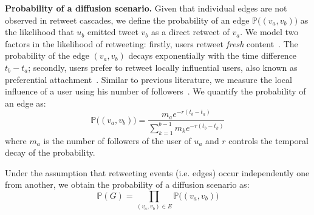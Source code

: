 \textbf{Probability of a diffusion scenario.}
Given that individual edges are not observed in retweet cascades, we define the probability of an edge $\mathds{P}\big((v_a, v_b)\big)$ as the likelihood that $u_b$ emitted tweet $v_b$ as a direct retweet of $v_a$.
We model two factors in the likelihood of retweeting:
firstly, users retweet \emph{fresh} content~\cite{Wu2007}.
The probability of the edge $(v_a, v_b)$ decays exponentially with the time difference $t_b - t_a$;
secondly, users prefer to retweet locally influential users, also known as preferential attachment~\cite{Barabasi2005}.
Similar to previous literature, we measure the local influence of a user using his number of followers~\cite{kwak2010twitter,Cha2010,Rizoiu2018}.
We quantify the probability of an edge as:
\begin{equation} \label{eq:prob-edge}
	\mathds{P}\big((v_a, v_b)\big) = \frac{m_a e^{-r({t_b-t_a})}}{\sum_{k=1}^{b-1} m_k e^{-r({t_b-t_k})}}
\end{equation}
where 
$m_a$ is the number of followers of the user of $u_a$ and
$r$ controls the temporal decay of the probability.

Under the assumption that retweeting events (i.e. edges) occur independently one from another, we obtain the probability of a diffusion scenario as:
\begin{equation} \label{eq:prob-scenario}
	\mathds{P}(G) = \prod_{(v_a,v_b) \in E} \mathds{P}\big((v_a, v_b)\big)
\end{equation}


